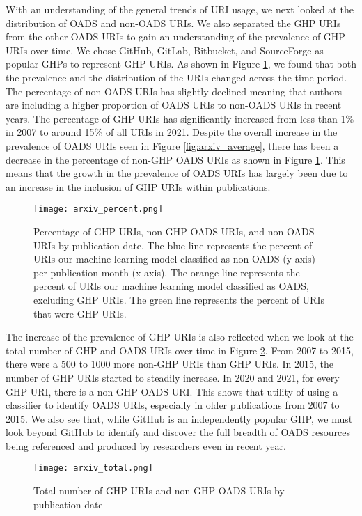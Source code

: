 With an understanding of the general trends of URI usage, we next looked at the distribution of OADS and non-OADS URIs. We also separated the GHP URIs from the other OADS URIs to gain an understanding of the prevalence of GHP URIs over time. We chose GitHub, GitLab, Bitbucket, and SourceForge as popular GHPs to represent GHP URIs. As shown in Figure \ref{fig:arxiv_percent}, we found that both the prevalence and the distribution of the URIs changed across the time period. The percentage of non-OADS URIs has slightly declined meaning that authors are including a higher proportion of OADS URIs to non-OADS URIs in recent years. The percentage of GHP URIs has significantly increased from less than 1\% in 2007 to around 15\% of all URIs in 2021. Despite the overall increase in the prevalence of OADS URIs seen in Figure \ref{fig:arxiv_average}, there has been a decrease in the percentage of non-GHP OADS URIs as shown in Figure \ref{fig:arxiv_percent}. This means that the growth in the prevalence of OADS URIs has largely been due to an increase in the inclusion of GHP URIs within publications. 

\begin{figure}
    \centering
    \texttt{[image: arxiv\_percent.png]}
    \caption{Percentage of GHP URIs, non-GHP OADS URIs, and non-OADS URIs by publication date. The blue line represents the percent of URIs our machine learning model classified as non-OADS (y-axis) per publication month (x-axis). The orange line represents the percent of URIs our machine learning model classified as OADS, excluding GHP URIs. The green line represents the percent of URIs that were GHP URIs.}
    \label{fig:arxiv_percent}
\end{figure}

The increase of the prevalence of GHP URIs is also reflected when we look at the total number of GHP and OADS URIs over time in Figure \ref{fig:arxiv_total}. From 2007 to 2015, there were a 500 to 1000 more non-GHP URIs than GHP URIs. In 2015, the number of GHP URIs started to steadily increase. In 2020 and 2021, for every GHP URI, there is a non-GHP OADS URI. This shows that utility of using a classifier to identify OADS URIs, especially in older publications from 2007 to 2015. We also see that, while GitHub is an independently popular GHP, we must look beyond GitHub to identify and discover the full breadth of OADS resources being referenced and produced by researchers even in recent year. 

\begin{figure}
    \centering
    \texttt{[image: arxiv\_total.png]}
    \caption{Total number of GHP URIs and non-GHP OADS URIs by publication date}
    \label{fig:arxiv_total}
\end{figure}

